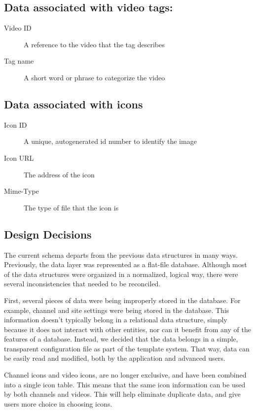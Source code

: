 \documentclass[a4paper,12pt]{report}
\begin{document}
\subsection{Data associated with video tags:}
\begin{description}
\item[Video ID] A reference to the video that the tag describes
\item[Tag name] A short word or phrase to categorize the video
\end{description}

\subsection{Data associated with icons}
\begin{description}
\item[Icon ID] A unique, autogenerated id number to identify the image
\item[Icon URL] The address of the icon
\item[Mime-Type] The type of file that the icon is
\end{description}

\subsection{Design Decisions}
The current schema departs from the previous data structures in many ways.
Previously, the data layer was represented as a flat-file database.
Although most of the data structures were organized in a normalized, logical way, there were several inconsistencies that needed to be reconciled.


First, several pieces of data were being improperly stored in the database. 
For example, channel and site settings were being stored in the database. 
This information doesn't typically belong in a relational data structure, simply because it does not interact with other entities, nor can it benefit from any of the features of a database. 
Instead, we decided that the data belongs in a simple, transparent configuration file as part of the template system. 
That way, data can be easily read and modified, both by the application and advanced users. 


Channel icons and video icons, are no longer exclusive, and have been combined into a single icon table.
This means that the same icon information can be used by both channels and videos. This will help eliminate duplicate data, and give users more choice in choosing icons.
\end{document}
